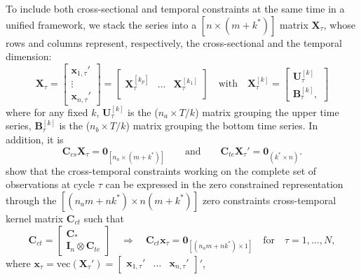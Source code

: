 \documentclass[a4paper,11pt]{article}
\newcommand{\xvet}{\bm{x}}
\newcommand{\Bvet}{\bm{B}}
\newcommand{\Cvet}{\bm{C}}
\newcommand{\Ivet}{\bm{I}}
\newcommand{\Uvet}{\bm{U}}
\newcommand{\Xvet}{\bm{X}}
\newcommand{\Zerovet}{\bm{0}}
\theoremstyle{definition}
\begin{document}
To include both cross-sectional and temporal constraints at the same time in a unified framework, we stack the series into a $\left[n \times (m+k^\ast)\right]$ matrix $\Xvet_\tau$, whose rows and columns represent, respectively, the cross-sectional and the temporal dimension:
\begin{equation}
\label{eq:Xtau}
\Xvet_\tau = \begin{bmatrix}
	\xvet_{1,\tau}'\\
	\vdots \\
	\xvet_{n,\tau}'
\end{bmatrix} = \begin{bmatrix}
\Xvet_{\tau}^{[k_p]} & \dots & \Xvet_{\tau}^{[k_1]} \\ \end{bmatrix}
\quad \text{with} \quad \Xvet_{\tau}^{[k]} = \begin{bmatrix}
	\Uvet_{\tau}^{[k]} \\
	\Bvet_{\tau}^{[k]},
\end{bmatrix}
\end{equation}
where for any fixed $k$,
$\Uvet_{\tau}^{[k]}$ is the ($n_a\times T/k$) matrix grouping the upper time series, $\Bvet_{\tau}^{[k]}$ is the ($n_b\times T/k$) matrix grouping the bottom time series. In addition, it is
$$
\Cvet_{cs}\Xvet_\tau = \Zerovet_{\left[n_a \times (m+k^\ast)\right]} \qquad \text{and} \qquad \Cvet_{te}\Xvet_\tau' = \Zerovet_{(k^\ast \times n)} .
$$
\cite{difonzo2023} show that the cross-temporal constraints working on the complete set of observations at cycle $\tau$ can be expressed in the zero constrained representation through the $\left[(n_am+nk^\ast)\times n(m+k^\ast)\right]$ zero constraints cross-temporal kernel matrix $\Cvet_{ct}$ such that
\begin{equation}
\label{eq:Cct}
	\Cvet_{ct} = \begin{bmatrix}
	\Cvet_\ast\\
	\Ivet_n \otimes \Cvet_{te}
\end{bmatrix} \quad \Longrightarrow \quad 
\Cvet_{ct} \xvet_{\tau} = \Zerovet_{[(n_am+nk^\ast)\times1]} \quad \mathrm{for} \quad \tau = 1,...,N,
\end{equation}
where 
$\xvet_{\tau} = \mathrm{vec}\left(\Xvet_{\tau}'\right) = \begin{bmatrix}
	\xvet_{1, \tau}' &
	\dots &
	\xvet_{n, \tau}'
\end{bmatrix}'$, %
\end{document}
